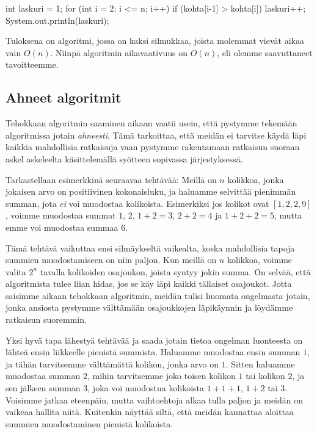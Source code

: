 \begin{code}
int laskuri = 1;
for (int i = 2; i <= n; i++) {
    if (kohta[i-1] > kohta[i]) {
        laskuri++;
    }
}
System.out.println(laskuri);
\end{code}

Tuloksena on algoritmi, jossa on kaksi silmukkaa,
joista molemmat vievät aikaa vain $O(n)$.
Niinpä algoritmin aikavaativuus on $O(n)$,
eli olemme saavuttaneet tavoitteemme.

\subsection{Ahneet algoritmit}

Tehokkaan algoritmin saaminen aikaan vaatii usein,
että pystymme tekemään algoritmissa jotain \emph{ahneesti}.
Tämä tarkoittaa, että meidän ei tarvitse käydä läpi
kaikkia mahdollisia ratkaisuja vaan pystymme rakentamaan
ratkaisun suoraan askel askeleelta käsittelemällä
syötteen sopivassa järjestyksessä.

Tarkastellaan esimerkkinä seuraavaa tehtävää:
Meillä on $n$ kolikkoa, jonka jokaisen arvo on positiivinen kokonaisluku,
ja haluamme selvittää pienimmän summan, jota \emph{ei} voi muodostaa kolikoista.
Esimerkiksi jos kolikot ovat $[1,2,2,9]$, voimme muodostaa summat
$1$, $2$, $1+2=3$, $2+2=4$ ja $1+2+2=5$,
mutta emme voi muodostaa summaa $6$.

Tämä tehtävä vaikuttaa ensi silmäykseltä vaikealta,
koska mahdollisia tapoja summien muodostamiseen on niin paljon.
Kun meillä on $n$ kolikkoa, voimme valita $2^n$ tavalla
kolikoiden osajoukon, joista syntyy jokin summa.
On selvää, että algoritmista tulee liian hidas,
jos se käy läpi kaikki tällaiset osajoukot.
Jotta saisimme aikaan tehokkaan algoritmin,
meidän tulisi huomata ongelmasta jotain,
jonka ansiosta pystymme välttämään osajoukkojen läpikäynnin
ja löydämme ratkaisun suoremmin.

Yksi hyvä tapa lähestyä tehtävää ja saada jotain tietoa ongelman luonteesta
on lähteä ensin liikkeelle pienistä summista.
Haluamme muodostaa ensin summan $1$, ja tähän tarvitsemme välttämättä
kolikon, jonka arvo on $1$.
Sitten haluamme muodostaa summan $2$, mihin tarvitsemme joko
toisen kolikon $1$ tai kolikon $2$, ja sen jälkeen summan $3$,
joka voi muodostua kolikoista $1+1+1$, $1+2$ tai $3$.
Voisimme jatkaa eteenpäin, mutta vaihtoehtoja alkaa tulla
paljon ja meidän on vaikeaa hallita niitä.
Kuitenkin näyttää siltä, että meidän kannattaa aloittaa
summien muodostaminen pienistä kolikoista.

